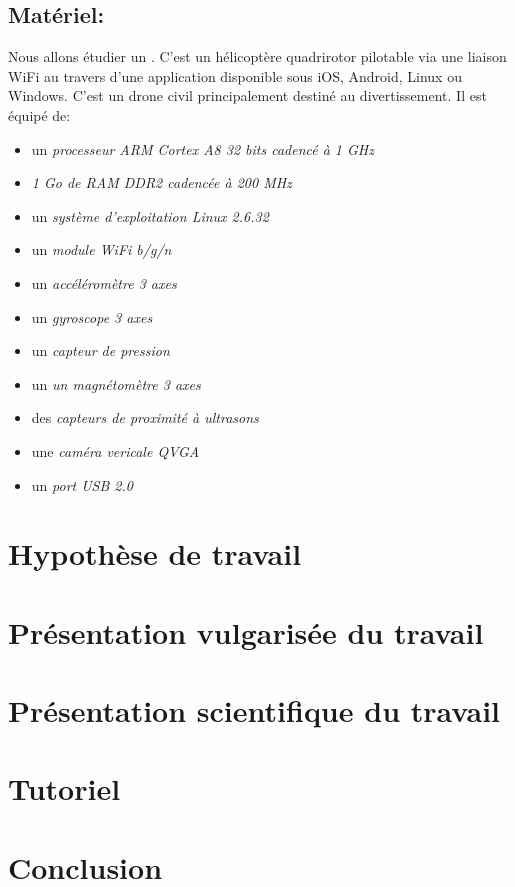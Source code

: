 \documentclass[a4paper,12pt]{report}
\begin{document}
\subsection{Matériel: }
Nous allons étudier un . C'est un hélicoptère quadrirotor pilotable via une liaison WiFi au travers d'une application disponible sous iOS, Android, Linux ou Windows. C'est un drone civil principalement destiné au divertissement. Il est équipé de: 
\medbreak
\begin{itemize}
    \item un \textit{processeur ARM Cortex A8 32 bits cadencé à 1 GHz}
    \item \textit{1 Go de RAM DDR2 cadencée à 200 MHz}
    \item un \textit{système d'exploitation Linux 2.6.32}
    \item un \textit{module WiFi b/g/n}
    \item un \textit{accéléromètre 3 axes}
    \item un \textit{gyroscope 3 axes}
    \item un \textit{capteur de pression}
    \item un \textit{un magnétomètre 3 axes}
    \item des \textit{capteurs de proximité à ultrasons}
    \item une \textit{caméra vericale QVGA}
    \item un \textit{port USB 2.0}
\end{itemize}


\section{Hypothèse de travail}

\section{Présentation vulgarisée du travail}

\section{Présentation scientifique du travail}

\section{Tutoriel}

\section{Conclusion}
\end{document}

